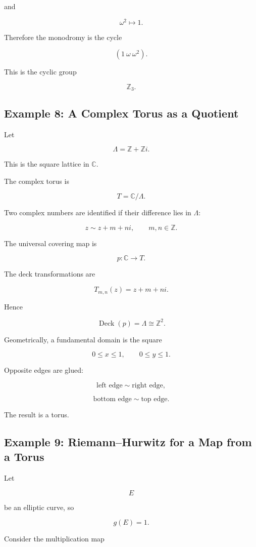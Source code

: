 \documentclass[12pt,a4paper]{article}
\theoremstyle{notespace}
\begin{document}
and

\[
\omega^2\mapsto1.
\]

Therefore the monodromy is the cycle

\[
(1\ \omega\ \omega^2).
\]

This is the cyclic group

\[
\mathbb Z_3.
\]

\subsection{Example 8: A Complex Torus as a Quotient}

Let

\[
\Lambda=\mathbb Z+\mathbb Z i.
\]

This is the square lattice in \(\mathbb C\).

The complex torus is

\[
T=\mathbb C/\Lambda.
\]

Two complex numbers are identified if their difference lies in \(\Lambda\):

\[
z\sim z+m+ni,
\qquad m,n\in\mathbb Z.
\]

The universal covering map is

\[
p:\mathbb C\to T.
\]

The deck transformations are

\[
T_{m,n}(z)=z+m+ni.
\]

Hence

\[
\operatorname{Deck}(p)=\Lambda\cong\mathbb Z^2.
\]

Geometrically, a fundamental domain is the square

\[
0\le x\le1,
\qquad
0\le y\le1.
\]

Opposite edges are glued:

\[
\text{left edge}\sim\text{right edge},
\]

\[
\text{bottom edge}\sim\text{top edge}.
\]

The result is a torus.

\subsection{Example 9: Riemann--Hurwitz for a Map from a Torus}

Let

\[
E
\]

be an elliptic curve, so

\[
g(E)=1.
\]

Consider the multiplication map
\end{document}
